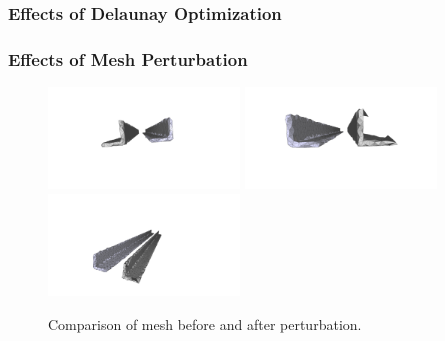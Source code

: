 \documentclass[12pt]{drexelthesis}
\let\Oldsubsubsection\subsubsection
\renewcommand{\subsubsection}{\FloatBarrier\Oldsubsubsection}
\begin{document}
\subsubsection{Effects of Delaunay Optimization}


\subsubsection{Effects of Mesh Perturbation}

\begin{figure}[!ht]
	\centering
		\includegraphics[trim={4in 2in 3in 2in},clip,width=2in]{simulated-lab-scan/0noise/optimized/advancedfrontperturbvslloyd00.png}
		\includegraphics[trim={1in 1in 2in 2in}, clip, width=2in]{simulated-lab-scan/0noise/optimized/advancedfrontperturbvslloyd01.png}
		\includegraphics[trim={1in 1in 1in 2in}, clip, width=2in]{simulated-lab-scan/0noise/optimized/advancedfrontperturbvslloyd02.png}
		\caption[Comparison of mesh before and after perturbation]{\centering  Comparison of mesh before and after perturbation.}
	\label{zeronoise:advancedlloydperturb}
\end{figure}
\end{document}
